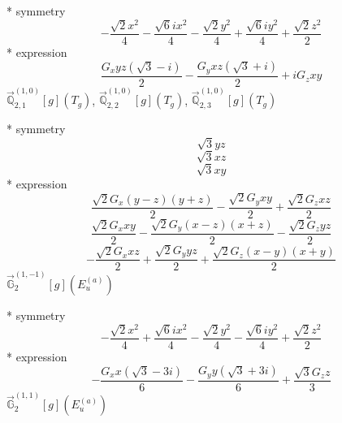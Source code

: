\documentclass[fleqn,8pt]{jsarticle}
\begin{document}
\noindent\quad ** symmetry
\begin{dmath*}
- \frac{\sqrt{2} x^{2}}{4} - \frac{\sqrt{6} i x^{2}}{4} - \frac{\sqrt{2} y^{2}}{4} + \frac{\sqrt{6} i y^{2}}{4} + \frac{\sqrt{2} z^{2}}{2}
\end{dmath*}
\noindent\quad ** expression
\begin{dmath*}
\frac{G_{x} y z \left(\sqrt{3} - i\right)}{2} - \frac{G_{y} x z \left(\sqrt{3} + i\right)}{2} + i G_{z} x y
\end{dmath*}
\noindent\quad $\vec{\mathbb{Q}}_{2,1}^{(1,0)}[g](T_{g})$, $\vec{\mathbb{Q}}_{2,2}^{(1,0)}[g](T_{g})$, $\vec{\mathbb{Q}}_{2,3}^{(1,0)}[g](T_{g})$

\noindent\quad ** symmetry
\begin{dmath*}
\sqrt{3} y z
\end{dmath*}
\begin{dmath*}
\sqrt{3} x z
\end{dmath*}
\begin{dmath*}
\sqrt{3} x y
\end{dmath*}
\noindent\quad ** expression
\begin{dmath*}
\frac{\sqrt{2} G_{x} \left(y - z\right) \left(y + z\right)}{2} - \frac{\sqrt{2} G_{y} x y}{2} + \frac{\sqrt{2} G_{z} x z}{2}
\end{dmath*}
\begin{dmath*}
\frac{\sqrt{2} G_{x} x y}{2} - \frac{\sqrt{2} G_{y} \left(x - z\right) \left(x + z\right)}{2} - \frac{\sqrt{2} G_{z} y z}{2}
\end{dmath*}
\begin{dmath*}
- \frac{\sqrt{2} G_{x} x z}{2} + \frac{\sqrt{2} G_{y} y z}{2} + \frac{\sqrt{2} G_{z} \left(x - y\right) \left(x + y\right)}{2}
\end{dmath*}
\noindent\quad $\vec{\mathbb{G}}_{2}^{(1,-1)}[g](E_{u}^{(a)})$

\noindent\quad ** symmetry
\begin{dmath*}
- \frac{\sqrt{2} x^{2}}{4} + \frac{\sqrt{6} i x^{2}}{4} - \frac{\sqrt{2} y^{2}}{4} - \frac{\sqrt{6} i y^{2}}{4} + \frac{\sqrt{2} z^{2}}{2}
\end{dmath*}
\noindent\quad ** expression
\begin{dmath*}
- \frac{G_{x} x \left(\sqrt{3} - 3 i\right)}{6} - \frac{G_{y} y \left(\sqrt{3} + 3 i\right)}{6} + \frac{\sqrt{3} G_{z} z}{3}
\end{dmath*}
\noindent\quad $\vec{\mathbb{G}}_{2}^{(1,1)}[g](E_{u}^{(a)})$
\end{document}
